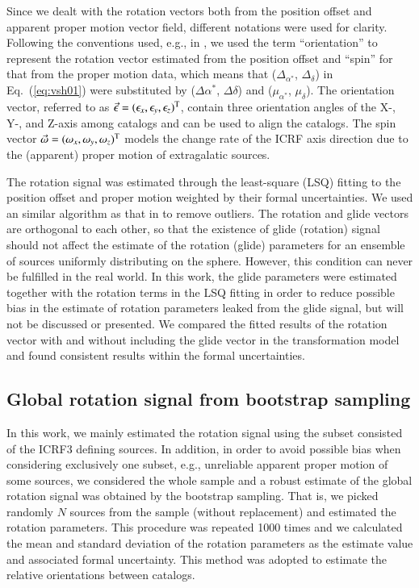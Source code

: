 \documentclass{aa}
\begin{document}
    Since we dealt with the rotation vectors both from the position offset and apparent proper motion vector field, different notations were used for clarity.
    Following the conventions used, e.g., in \citet[][]{2018A&A...616A..14G}, we used the term ``orientation'' to represent the rotation vector estimated from the position offset and ``spin'' for that from the proper motion data, which means that ($\Delta_{\alpha^*}$, $\Delta_{\delta}$) in Eq.~(\ref{eq:vsh01}) were substituted by ($\Delta\alpha^*$, $\Delta\delta$) and ($\mu_{\alpha^*}$, $\mu_\delta$).
    The orientation vector, referred to as $\vec{\epsilon}=(\epsilon_x,\epsilon_y,\epsilon_z)^{\rm T}$, contain three orientation angles of the X-, Y-, and Z-axis among catalogs and can be used to align the catalogs.
    The spin vector $\vec{\omega}=(\omega_x,\omega_y,\omega_z)^{\rm T}$ models the change rate of the ICRF axis direction due to the (apparent) proper motion of extragalatic sources.
    
    The rotation signal was estimated through the least-square (LSQ) fitting to the position offset and proper motion weighted by their formal uncertainties.
    We used an similar algorithm as that in \citet[][]{2020A&A...634A..28L} to remove outliers.
    The rotation and glide vectors are orthogonal to each other, so that the existence of glide (rotation) signal should not affect the estimate of the rotation (glide) parameters for an ensemble of sources uniformly distributing on the sphere.
    However, this condition can never be fulfilled in the real world.
    In this work, the glide parameters were estimated together with the rotation terms in the LSQ fitting in order to reduce possible bias in the estimate of rotation parameters leaked from the glide signal, but will not be discussed or presented.
    We compared the fitted results of the rotation vector with and without including the glide vector in the transformation model and found consistent results within the formal uncertainties.
    

\subsection{Global rotation signal from bootstrap sampling}  \label{subsec:bs-mathod}
    
    In this work, we mainly estimated the rotation signal using the subset consisted of the ICRF3 defining sources.
    In addition, in order to avoid possible bias when considering exclusively one subset, e.g., unreliable apparent proper motion of some sources, we considered the whole sample and a robust estimate of the global rotation signal was obtained by the bootstrap sampling.
    That is, we picked randomly $N$ sources from the sample (without replacement) and estimated the rotation parameters.
    This procedure was repeated 1000 times and we calculated the mean and standard deviation of the rotation parameters as the estimate value and associated formal uncertainty.
    This method was adopted to estimate the relative orientations between catalogs.
   
\end{document}
